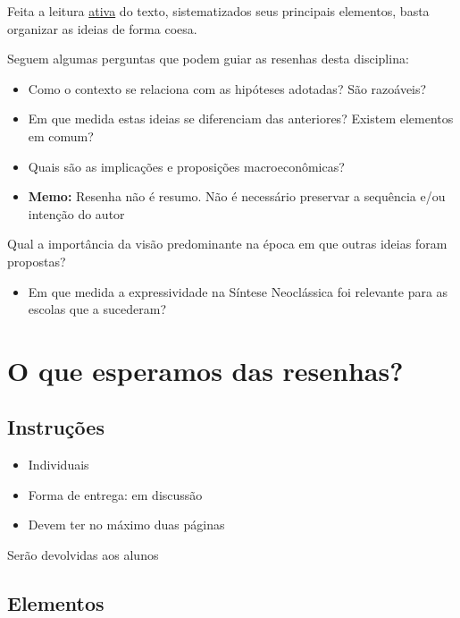 \documentclass[11pt]{article}
\begin{document}
Feita a leitura \uline{ativa} do texto, sistematizados seus principais elementos, basta organizar as ideias de forma coesa. 

\begin{NOTES}
Seguem algumas perguntas que podem guiar as resenhas desta disciplina:
\end{NOTES}

\begin{itemize}
\item Como o contexto se relaciona com as hipóteses adotadas? São razoáveis?
\item Em que medida estas ideias se diferenciam das anteriores? Existem elementos em comum?
\item Quais são as implicações e proposições macroeconômicas?
\item \textbf{Memo:} Resenha não é resumo. Não é necessário preservar a sequência e/ou intenção do autor
\end{itemize}

\begin{NOTES}
Qual a importância da visão predominante na época em que outras ideias foram propostas?
\begin{itemize}
\item Em que medida a expressividade na Síntese Neoclássica foi relevante para as escolas que a sucederam?
\end{itemize}
\end{NOTES}

\section*{O que esperamos das resenhas?}
\label{sec:orgc3a642a}

\subsection*{Instruções}
\label{sec:org2b6d315}

\begin{itemize}
\item Individuais
\item Forma de entrega: em discussão
\item Devem ter no máximo duas páginas
\end{itemize}

Serão devolvidas aos alunos

\subsection*{Elementos}
\label{sec:org45ef676}
\end{document}
